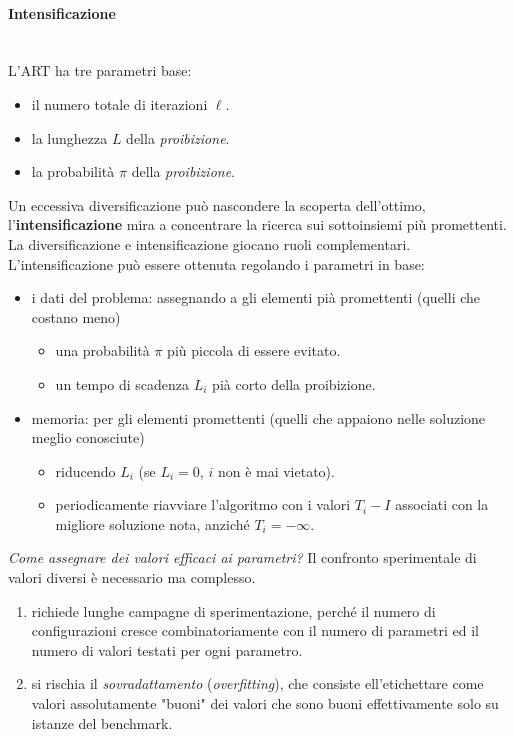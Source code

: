 \documentclass{article}
\begin{document}
\paragraph{Intensificazione}\mbox{}\\
L'ART ha tre parametri base:
\begin{itemize}
    \item il numero totale di iterazioni $\ell$.
    \item la lunghezza $L$ della \textit{proibizione}.
    \item la probabilità $\pi$ della \textit{proibizione}.
\end{itemize}
Un eccessiva diversificazione può nascondere la scoperta dell'ottimo, l'\textbf{intensificazione}
mira a concentrare la ricerca sui sottoinsiemi più promettenti. La diversificazione e intensificazione
giocano ruoli complementari.
L'intensificazione può essere ottenuta regolando i parametri in base:
\begin{itemize}
    \item i dati del problema: assegnando a gli elementi pià promettenti (quelli che costano meno)
          \begin{itemize}
              \item una probabilità $\pi$ più piccola di essere evitato.
              \item un tempo di scadenza $L_i$ pià corto della proibizione.
          \end{itemize}
    \item memoria: per gli elementi promettenti (quelli che appaiono nelle soluzione meglio conosciute)
          \begin{itemize}
              \item riducendo $L_i$ (se $L_i=0$, $i$ non è mai vietato).
              \item periodicamente riavviare l'algoritmo con i valori $T_i -I$ associati con la migliore
                    soluzione nota, anziché $T_i=-\infty$.
          \end{itemize}
\end{itemize}

\textit{Come assegnare dei valori efficaci ai parametri?} Il confronto sperimentale di valori diversi
è necessario ma complesso.
\begin{enumerate}
    \item richiede lunghe campagne di sperimentazione, perché il numero di configurazioni
          cresce combinatoriamente con il numero di parametri ed il numero di valori testati per ogni
          parametro.
    \item si rischia il \textit{sovradattamento} (\textit{overfitting}), che consiste ell'etichettare
          come valori assolutamente "buoni" dei valori che sono buoni effettivamente solo su istanze del benchmark.
\end{enumerate}
\end{document}
